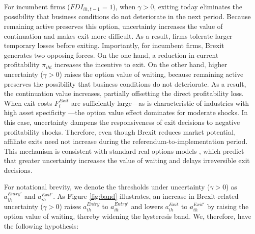 \documentclass[preprint,11pt,authoryear]{elsarticle}
\begin{document}
For incumbent firms ($FDI_{ih,t-1} = 1$), when $\gamma > 0$, exiting today eliminates the possibility that business conditions do not deteriorate in the next period. 
Because remaining active preserves this option, uncertainty increases the value of continuation and makes exit more difficult. 
As a result, firms tolerate larger temporary losses before exiting.
Importantly, for incumbent firms, Brexit generates two opposing forces. 
On the one hand, a reduction in current profitability $\pi_{iht}$ increases the incentive to exit. 
On the other hand, higher uncertainty ($\gamma>0$) raises the option value of waiting, because remaining active preserves the possibility that business conditions do not deteriorate. 
As a result, the continuation value increases, partially offsetting the direct profitability loss.
When exit costs $F_i^{Exit}$ are sufficiently large---as is characteristic of industries with high asset specificity \citep{kim2017asset}---the option value effect dominates for moderate shocks.
In this case, uncertainty dampens the responsiveness of exit decisions to negative profitability shocks. 
Therefore, even though Brexit reduces market potential, affiliate exits need not increase during the referendum-to-implementation period.
This mechanism is consistent with standard real options models \citep{bloom2018brexit, belderbos2017multinational}, which predict that greater uncertainty increases the value of waiting and delays irreversible exit decisions.

For notational brevity, we denote the thresholds under uncertainty ($\gamma > 0$) as $a_{ih}^{Entry'}$ and $a_{ih}^{Exit'}$.
As Figure \ref{fig:band} illustrates, an increase in Brexit-related uncertainty ($\gamma>0$) raises $a_{ih}^{Entry}$ to $a_{ih}^{Entry'}$ and lowers $a_{ih}^{Exit}$ to $a_{ih}^{Exit'}$ by raising the option value of waiting, thereby widening the hysteresis band.
We, therefore, have the following hypothesis:
\end{document}
